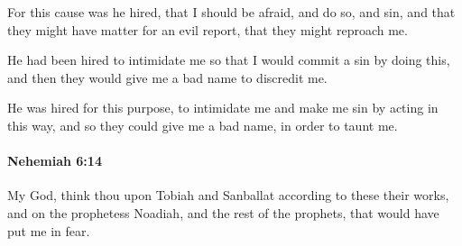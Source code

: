 			\begin{versebox}
					\item[BHS] 
					\item[LXX] 
					\item[ASV] For this cause was he hired, that I should be afraid, and do so, and sin, and that they might have matter for an evil report, that they might reproach me.
					\item[NIV] He had been hired to intimidate me so that I would commit a sin by doing this, and then they would give me a bad name to discredit me.
					\item[NRSV] He was hired for this purpose, to intimidate me and make me sin by acting in this way, and so they could give me a bad name, in order to taunt me.
			\end{versebox}

		\paragraph{Nehemiah 6:14} %
			\label{NEHEMIAH-6-14}

			My God, think thou upon Tobiah and Sanballat according to these their works, and on the prophetess Noadiah, and the rest of the prophets, that would have put me in fear.

